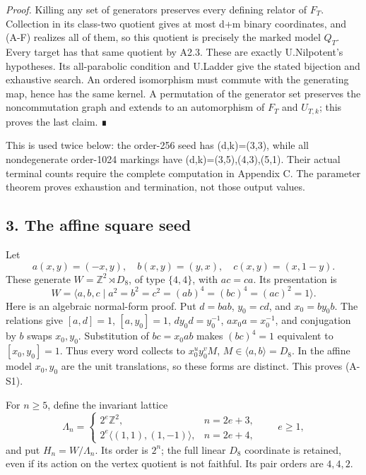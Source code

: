 \documentclass[
  11pt,
  a4paper,
]{article}
\begin{document}
\emph{Proof.} Killing any set of generators preserves every defining
relator of \(F_T\). Collection in its class-two quotient gives at most
d+m binary coordinates, and (A-F) realizes all of them, so this quotient
is precisely the marked model \(Q_T\). Every target has that same
quotient by A2.3. These are exactly U.Nilpotent's hypotheses. Its
all-parabolic condition and U.Ladder give the stated bijection and
exhaustive search. An ordered isomorphism must commute with the
generating map, hence has the same kernel. A permutation of the
generator set preserves the noncommutation graph and extends to an
automorphism of \(F_T\) and \(U_{T,k}\); this proves the last claim. ∎

This is used twice below: the order-256 seed has (d,k)=(3,3), while all
nondegenerate order-1024 markings have (d,k)=(3,5),(4,3),(5,1). Their
actual terminal counts require the complete computation in Appendix C.
The parameter theorem proves exhaustion and termination, not those
output values.

\subsection{3. The affine square seed}\label{the-affine-square-seed}

Let \[
 a(x,y)=(-x,y),\quad b(x,y)=(y,x),\quad c(x,y)=(x,1-y).
\] These generate \(W=\mathbb Z^2\rtimes D_8\), of type \(\{4,4\}\),
with \(ac=ca\). Its presentation is \[
 W=\langle a,b,c\mid a^2=b^2=c^2=(ab)^4=(bc)^4=(ac)^2=1\rangle. \tag{A-S1}
\] Here is an algebraic normal-form proof. Put \(d=bab\), \(y_0=cd\),
and \(x_0=by_0b\). The relations give \([a,d]=1\), \([a,y_0]=1\),
\(dy_0d=y_0^{-1}\), \(ax_0a=x_0^{-1}\), and conjugation by \(b\) swaps
\(x_0,y_0\). Substitution of \(bc=x_0ab\) makes \((bc)^4=1\) equivalent
to \([x_0,y_0]=1\). Thus every word collects to \(x_0^u y_0^v M\),
\(M\in\langle a,b\rangle=D_8\). In the affine model \(x_0,y_0\) are the
unit translations, so these forms are distinct. This proves (A-S1).

For \(n\ge5\), define the invariant lattice \[
 \Lambda_n=\begin{cases}
  2^e\mathbb Z^2,&n=2e+3,\\
  2^e\langle(1,1),(1,-1)\rangle,&n=2e+4,
 \end{cases}\qquad e\ge1,
\] and put \(H_n=W/\Lambda_n\). Its order is \(2^n\); the full linear
\(D_8\) coordinate is retained, even if its action on the vertex
quotient is not faithful. Its pair orders are \(4,4,2\).
\end{document}
